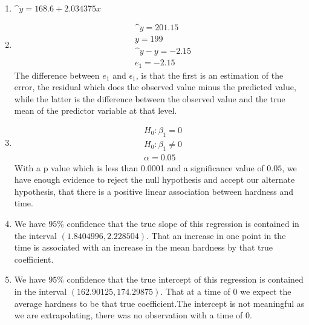 \documentclass[10pt]{article}
\newenvironment{answer}[2][Answer]{\begin{trivlist}
\item[\hskip \labelsep {\bfseries #1}\hskip \labelsep {\bfseries #2.}]}{\end{trivlist}}
\begin{document}
\begin{answer}{8}
$ $\newline
\begin{enumerate}
    \item $\^y=168.6+2.034375x$
    \item 
    \begin{equation}
    \begin{split}
    & \^y = 201.15 \\
    & y = 199 \\
    & \^y - y = -2.15 \\
    & e_{1} = -2.15
    \end{split}
    \end{equation}
    The difference between $e_{1}$ and $\epsilon_{1}$, is that the first is an estimation of the error, the residual which does the observed value minus the predicted value, while the latter is the difference between the observed value and the true mean of the predictor variable at that level.
    \item 
    \begin{equation}
    \begin{split}
    & H_{0} : \beta_{1} = 0 \\
    & H_{0} : \beta_{1} \neq 0 \\
    & \alpha = 0.05
    \end{split}
    \end{equation}
    With a p value which is less than 0.0001 and a significance value of $0.05$, we have enough evidence to reject the null hypothesis and accept our alternate hypothesis, that there is a positive linear association between hardness and time.
    \item We have $95\%$ confidence that the true slope of this regression is contained in the interval $(1.8404996,2.228504)$. That an increase in one point in the time is associated with an increase in the mean hardness by that true coefficient.
    \item We have $95\%$ confidence that the true intercept of this regression is contained in the interval $(162.90125,174.29875)$. That at a time of 0 we expect the average hardness to be that true coefficient.The intercept is not meaningful as we are extrapolating, there was no observation with a time of 0.
\end{enumerate}
\end{answer}
\end{document}
